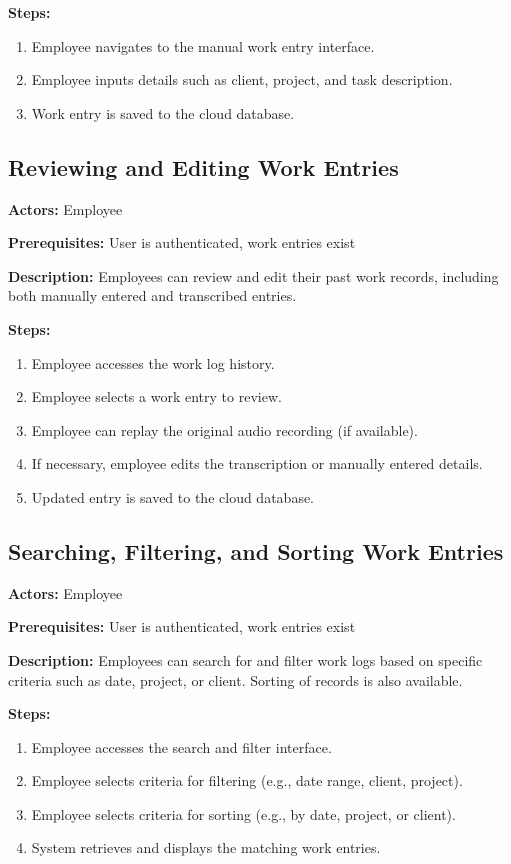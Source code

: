 \documentclass[
  digital,     %
  oneside,     %
  nosansbold,  %
  nocolorbold, %
  lof,         %
  lot,         %
]{fithesis4}
\begin{document}
\noindent \textbf{Steps:}
\begin{enumerate}
    \item Employee navigates to the manual work entry interface.
    \item Employee inputs details such as client, project, and task description.
    \item Work entry is saved to the cloud database.
\end{enumerate}

\subsection{Reviewing and Editing Work Entries}

\noindent \textbf{Actors:} Employee

\noindent \textbf{Prerequisites:} User is authenticated, work entries exist

\noindent \textbf{Description:}  
Employees can review and edit their past work records, including both manually entered and transcribed entries.

\noindent \textbf{Steps:}
\begin{enumerate}
    \item Employee accesses the work log history.
    \item Employee selects a work entry to review.
    \item Employee can replay the original audio recording (if available).
    \item If necessary, employee edits the transcription or manually entered details.
    \item Updated entry is saved to the cloud database.
\end{enumerate}

\subsection{Searching, Filtering, and Sorting Work Entries}

\noindent \textbf{Actors:} Employee

\noindent \textbf{Prerequisites:} User is authenticated, work entries exist

\noindent \textbf{Description:}  
Employees can search for and filter work logs based on specific criteria such as date, project, or client. Sorting of records is also available.

\noindent \textbf{Steps:}
\begin{enumerate}
    \item Employee accesses the search and filter interface.
    \item Employee selects criteria for filtering (e.g., date range, client, project).
    \item Employee selects criteria for sorting (e.g., by date, project, or client).
    \item System retrieves and displays the matching work entries.
\end{enumerate}
\end{document}

